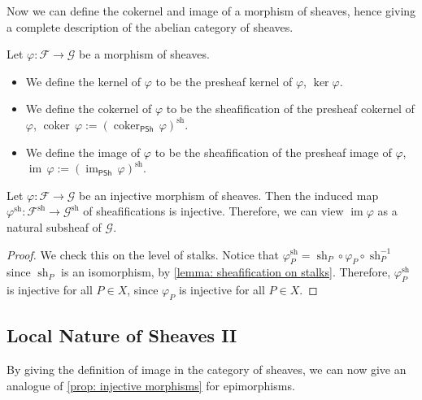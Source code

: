 \documentclass[11pt]{article}
\newcommand{\im}{\operatorname{im}}
\newcommand{\PSh}{\mathsf{PSh}}
\newcommand{\sh}{\operatorname{sh}}
\begin{document}
Now we can define the cokernel and image of a morphism of sheaves, 
hence giving a complete description of the abelian category of sheaves. 

\begin{definition}
    Let $\varphi: \mathscr{F} \to \mathscr{G}$ be a morphism of sheaves. 
    \begin{itemize}
        \item We define the kernel of $\varphi$ to be the presheaf kernel of $\varphi$, 
        $ \ker \varphi $. 
        \item We define the cokernel of $\varphi$ to be the sheafification of the presheaf cokernel of $\varphi$, 
    $\operatorname{coker}\,\varphi := (\operatorname{coker}_{\PSh}\,\varphi)^{\sh}.$
        \item We define the image of $\varphi$ to be the sheafification of the presheaf image of $\varphi$, 
    $\operatorname{im}\,\varphi := (\operatorname{im}_{\PSh}\,\varphi)^{\sh}.$ 
    \end{itemize}
\end{definition}

\begin{corollary}
    \cite[Exercise II.1.4]{hartsAG}
    Let $\varphi: \mathscr{F} \to \mathscr{G}$ be an injective morphism of sheaves. 
    Then the induced map $\varphi^{\sh} : \mathscr{F}^{\sh}\to \mathscr{G}^{\sh}$ 
    of sheafifications is injective. 
    Therefore, we can view $\im \varphi$ as a natural subsheaf 
    of $\mathscr{G}$. 
\end{corollary}

\begin{proof}
    We check this on the level of stalks. 
    Notice that $ \varphi^{\sh}_{P} = \sh_{P} \circ \varphi_{P} \circ \sh_{P}^{-1} $ 
    since $ \sh_{P} $ is an isomorphism, by \ref{lemma: sheafification on stalks}. 
    Therefore, $ \varphi^{\sh}_{P} $ is injective for all $ P \in X $, 
    since $ \varphi_{P} $ is injective for all $ P \in X $. 
\end{proof}

\subsection{Local Nature of Sheaves II}

By giving the definition of image in the category of sheaves, 
we can now give an analogue of \autoref{prop: injective morphisms} for epimorphisms. 
\end{document}
